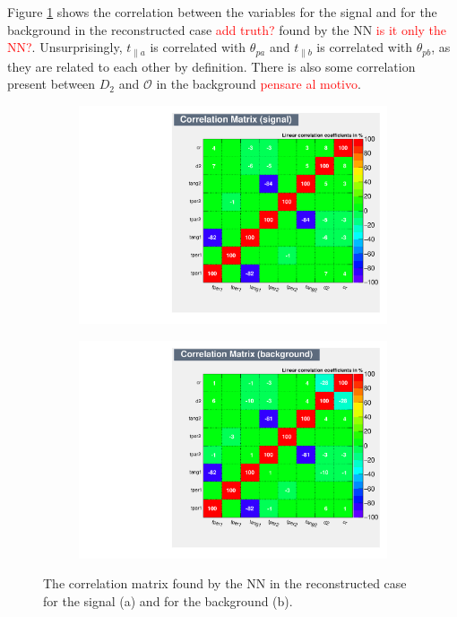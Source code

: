 \documentclass[10pt,a4paper]{book}
\newcommand\todo[1]{\textcolor{red}{#1}}
\begin{document}
Figure \ref{correlation reco} shows the correlation between the variables for the signal and for the background in the reconstructed case \todo{add truth?} found by the NN \todo{is it only the NN?}. Unsurprisingly, $t_{\parallel a}$ is correlated with $\theta_{pa}$ and $t_{\parallel b}$ is correlated with $\theta_{pb}$, as they are related to each other by definition. There is also some correlation present between $D_2$ and $\mathcal{O}$ in the background \todo{pensare al motivo}. 

\begin{figure}[h]
\begin{subfigure}{1.0\textwidth}
\centering
\includegraphics[scale=0.55]{ch4_images/Corr_matrix_reco_sgn}
\caption{}
\end{subfigure}
\begin{subfigure}{1.0\textwidth}
\centering
\includegraphics[scale=0.55]{ch4_images/Corr_matrix_reco_bkg}
\caption{}
\end{subfigure}
\caption{The correlation matrix found by the NN in the reconstructed case for the signal (a) and for the background (b).}
\label{correlation reco}
\end{figure} 
\end{document}
